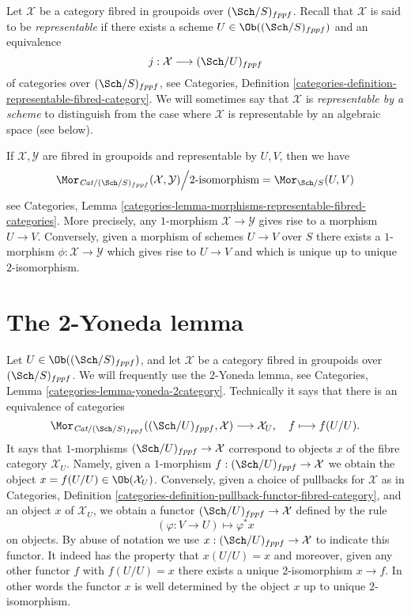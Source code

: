 \medskip\noindent
Let $\mathcal{X}$ be a category fibred in groupoids over
$(\Sch/S)_{fppf}$. Recall that $\mathcal{X}$
is said to be {\it representable} if there exists a
scheme $U \in \Ob((\Sch/S)_{fppf})$ and an
equivalence
$$
j : \mathcal{X} \longrightarrow (\Sch/U)_{fppf}
$$
of categories over $(\Sch/S)_{fppf}$, see
Categories,
Definition \ref{categories-definition-representable-fibred-category}.
We will sometimes say that $\mathcal{X}$ is
{\it representable by a scheme} to distinguish from the case
where $\mathcal{X}$ is representable by an algebraic space (see
below).

\medskip\noindent
If $\mathcal{X}, \mathcal{Y}$ are fibred in groupoids and
representable by $U, V$, then we have
\begin{equation}
\label{equation-morphisms-schemes}
\Mor_{\textit{Cat}/(\Sch/S)_{fppf}}(\mathcal{X}, \mathcal{Y})
\Big/
2\text{-isomorphism}
=
\Mor_{\Sch/S}(U, V)
\end{equation}
see
Categories,
Lemma \ref{categories-lemma-morphisms-representable-fibred-categories}.
More precisely, any $1$-morphism $\mathcal{X} \to \mathcal{Y}$
gives rise to a morphism $U \to V$. Conversely, given a morphism
of schemes $U \to V$ over $S$ there exists a $1$-morphism
$\phi : \mathcal{X} \to \mathcal{Y}$ which gives rise to $U \to V$
and which is unique up to unique $2$-isomorphism.






\section{The 2-Yoneda lemma}
\label{section-2-yoneda}

\noindent
Let $U \in \Ob((\Sch/S)_{fppf})$, and let $\mathcal{X}$ be a
category fibred in groupoids over $(\Sch/S)_{fppf}$.
We will frequently use the $2$-Yoneda lemma, see
Categories, Lemma \ref{categories-lemma-yoneda-2category}.
Technically it says that there is an equivalence of categories
$$
\Mor_{\textit{Cat}/(\Sch/S)_{fppf}}(
(\Sch/U)_{fppf}, \mathcal{X})
\longrightarrow
\mathcal{X}_U, \quad
f \longmapsto f(U/U).
$$
It says that $1$-morphisms $(\Sch/U)_{fppf} \to \mathcal{X}$
correspond to objects $x$ of the fibre category $\mathcal{X}_U$.
Namely, given a $1$-morphism $f : (\Sch/U)_{fppf} \to \mathcal{X}$
we obtain the object $x = f(U/U) \in \Ob(\mathcal{X}_U)$.
Conversely, given a choice of pullbacks for $\mathcal{X}$ as in
Categories,
Definition \ref{categories-definition-pullback-functor-fibred-category},
and an object $x$ of $\mathcal{X}_U$, we obtain a functor
$(\Sch/U)_{fppf} \to \mathcal{X}$ defined by the rule
$$
(\varphi : V \to U) \longmapsto \varphi^*x
$$
on objects. By abuse of notation we use
$x : (\Sch/U)_{fppf} \to \mathcal{X}$
to indicate this functor. It indeed has the property that $x(U/U) = x$
and moreover, given any other functor $f$ with $f(U/U) = x$ there exists
a unique $2$-isomorphism $x \to f$. In other words the functor $x$
is well determined by the object $x$ up to unique $2$-isomorphism.

